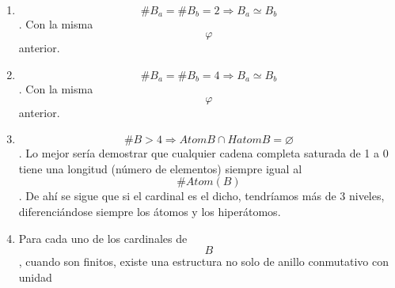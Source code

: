 \begin{enumerate}
\begin{enumerate}
\begin{enumerate}
      \begin{enumerate}
      \def\labelenumiv{\arabic{enumiv}.}
      \tightlist
      \item
        \[\begin{matrix}
        {n{: = \#}\left( {\mathit{Atom}B} \right)} \\
        {{n \leq m}{: = \#}\left( B \right)} \\
        {\left\lbrack {1,n} \right\rbrack_{\mathbb{N}}{: = {\{{1,2,\ldots,n}\}}}} \\
        {\varphi:\wp{\left( {\mathit{Atom}\left( B \right)} \right)\rightarrow B}} \\
        {{\varphi{(x)}}{: =}\begin{Bmatrix}
        0 & \Leftarrow & {{x = \varnothing} = {\{\}}} \\
        {x_{1}'} & \Leftarrow & {x = {\{{x_{1}'}\}}} \\
        {{\sum\limits_{\substack{k \in I \\ I \subset {\lbrack{1,n}\rbrack}_{\mathbb{N}}}}x_{k}}'} & \Leftarrow & {x = {\{{{x_{i}'} \mid {{i \in I} \subset \left\lbrack {1,n} \right\rbrack_{\mathbb{N}}}}\}}} \\
        {x_{1}{{' + \ldots} + x_{i - 1}}{' + x_{i}}{{' + \ldots} + x_{n}}'} & \Leftarrow & {{x = \mathit{Atom}}{{(B)} \smallsetminus {\{{x_{i}'}\}}}} \\
        1 & \Leftarrow & {{x = \mathit{Atom}}{(B)}}
        \end{Bmatrix}}
        \end{matrix}\].
      \end{enumerate}
    \item
      \[\#{B_{a} = \#}{B_{b} = 2}\Rightarrow{B_{a} \simeq B_{b}}\]. Con
      la misma \[\varphi\] anterior.
    \item
      \[\#{B_{a} = \#}{B_{b} = 4}\Rightarrow{B_{a} \simeq B_{b}}\]. Con
      la misma \[\varphi\] anterior.
    \item
      \[\#{B > 4}\Rightarrow\mathit{Atom}{B \cap \mathit{Hatom}}{B = \varnothing}\].
      Lo mejor sería demostrar que cualquier cadena completa saturada de
      1 a 0 tiene una longitud (número de elementos) siempre igual al
      \[\#\mathit{Atom}{(B)}\]. De ahí se sigue que si el cardinal es el
      dicho, tendríamos más de 3 niveles, diferenciándose siempre los
      átomos y los hiperátomos.
    \item
      Para cada uno de los cardinales de \[B\], cuando son finitos,
      existe una estructura no solo de anillo conmutativo con unidad

\end{enumerate}
\end{enumerate}
\end{enumerate}
